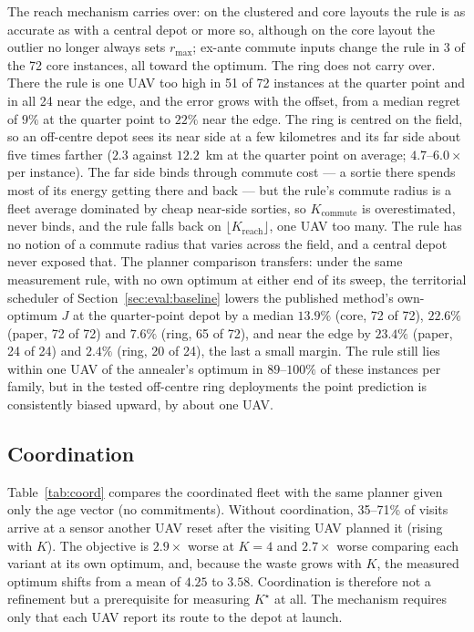 \documentclass[journal,outdir=./]{IEEEtran}
\newcommand{\Kr}{K_{\mathrm{reach}}}
\newcommand{\Kc}{K_{\mathrm{commute}}}
\newcommand{\rmax}{r_{\max}}
\begin{document}
The reach mechanism carries over: on the clustered and core layouts the rule is as accurate as with a central depot or more so, although on the core layout the outlier no longer always sets $\rmax$; ex-ante commute inputs change the rule in 3 of the 72 core instances, all toward the optimum. The ring does not carry over. There the rule is one UAV too high in 51 of 72 instances at the quarter point and in all 24 near the edge, and the error grows with the offset, from a median regret of $9\%$ at the quarter point to $22\%$ near the edge. The ring is centred on the field, so an off-centre depot sees its near side at a few kilometres and its far side about five times farther ($2.3$ against $12.2$~km at the quarter point on average; $4.7$--$6.0\times$ per instance). The far side binds through commute cost --- a sortie there spends most of its energy getting there and back --- but the rule's commute radius is a fleet average dominated by cheap near-side sorties, so $\Kc$ is overestimated, never binds, and the rule falls back on $\lfloor\Kr\rfloor$, one UAV too many. The rule has no notion of a commute radius that varies across the field, and a central depot never exposed that. The planner comparison transfers: under the same measurement rule, with no own optimum at either end of its sweep, the territorial scheduler of Section~\ref{sec:eval:baseline} lowers the published method's own-optimum $J$ at the quarter-point depot by a median $13.9\%$ (core, 72 of 72), $22.6\%$ (paper, 72 of 72) and $7.6\%$ (ring, 65 of 72), and near the edge by $23.4\%$ (paper, 24 of 24) and $2.4\%$ (ring, 20 of 24), the last a small margin. The rule still lies within one UAV of the annealer's optimum in $89$--$100\%$ of these instances per family, but in the tested off-centre ring deployments the point prediction is consistently biased upward, by about one UAV.

\subsection{Coordination}\label{sec:eval:coord}
Table~\ref{tab:coord} compares the coordinated fleet with the same planner given only the age vector (no commitments). Without coordination, 35--71\% of visits arrive at a sensor another UAV reset after the visiting UAV planned it (rising with $K$). The objective is $2.9\times$ worse at $K=4$ and $2.7\times$ worse comparing each variant at its own optimum, and, because the waste grows with $K$, the measured optimum shifts from a mean of $4.25$ to $3.58$. Coordination is therefore not a refinement but a prerequisite for measuring $K^{\star}$ at all. The mechanism requires only that each UAV report its route to the depot at launch.
\end{document}
